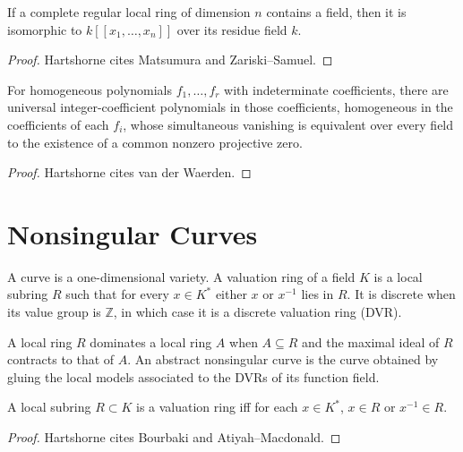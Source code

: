 \begin{theorem}
\label{thm:ha-ch1-5-5A}
If a complete regular local ring of dimension $n$ contains a field, then it is isomorphic to
$k[[x_1,\ldots,x_n]]$ over its residue field $k$.
\end{theorem}
\begin{proof}
Hartshorne cites Matsumura and Zariski--Samuel.
\end{proof}

\begin{theorem}
\label{thm:ha-ch1-5-7A}
For homogeneous polynomials $f_1,\ldots,f_r$ with indeterminate coefficients, there are universal
integer-coefficient polynomials in those coefficients, homogeneous in the coefficients of each
$f_i$, whose simultaneous vanishing is equivalent over every field to the existence of a common
nonzero projective zero.
\end{theorem}
\begin{proof}
Hartshorne cites van der Waerden.
\end{proof}

\section{Nonsingular Curves}

\begin{definition}
\label{def:ha-ch1-curve-valuation}
A curve is a one-dimensional variety. A valuation ring of a field $K$ is a local subring $R$
such that for every $x\in K^*$ either $x$ or $x^{-1}$ lies in $R$. It is discrete when its value
group is $\mathbb Z$, in which case it is a discrete valuation ring (DVR).
\end{definition}

\begin{definition}
\label{def:ha-ch1-abstract-curve}
A local ring $R$ dominates a local ring $A$ when $A\subseteq R$ and the maximal ideal of $R$
contracts to that of $A$. An abstract nonsingular curve is the curve obtained by gluing the local
models associated to the DVRs of its function field.
\end{definition}

\begin{theorem}
\label{thm:ha-ch1-6-1A}
A local subring $R\subset K$ is a valuation ring iff for each $x\in K^*$, $x\in R$ or
$x^{-1}\in R$.
\end{theorem}
\begin{proof}
Hartshorne cites Bourbaki and Atiyah--Macdonald.
\end{proof}

